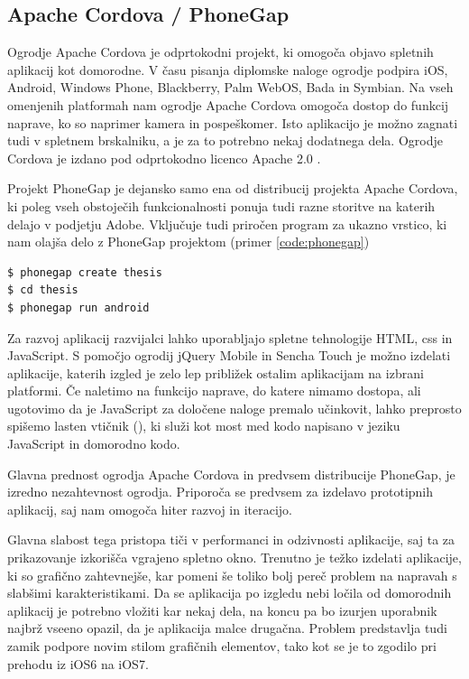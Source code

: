 \subsection{Apache Cordova / PhoneGap}

Ogrodje Apache Cordova\cite{cordova} je odprtokodni projekt, ki omogoča objavo spletnih aplikacij kot domorodne. V času pisanja diplomske naloge ogrodje podpira iOS, Android, Windows Phone, Blackberry, Palm WebOS, Bada in Symbian. Na vseh omenjenih platformah nam ogrodje Apache Cordova omogoča dostop do funkcij naprave, ko so naprimer kamera in pospeškomer. Isto aplikacijo je možno zagnati tudi v spletnem brskalniku, a je za to potrebno nekaj dodatnega dela. Ogrodje Cordova je izdano pod odprtokodno licenco Apache 2.0 \cite{apache-licence}.

Projekt PhoneGap\cite{phonegap} je dejansko samo ena od distribucij projekta Apache Cordova, ki poleg vseh obstoječih funkcionalnosti ponuja tudi razne storitve na katerih delajo v podjetju Adobe. Vključuje tudi priročen program za ukazno vrstico, ki nam olajša delo z PhoneGap projektom (primer \ref{code:phonegap})

\begin{lstlisting}[caption=Primer uporabe programa phonegap za ukazno vrstico. Zadnja vrstica zažene pravkar ustvarjeno prazno aplikacijo na android napravi ali emulatorju., label=code:phonegap]
$ phonegap create thesis
$ cd thesis
$ phonegap run android
\end{lstlisting}

Za razvoj aplikacij razvijalci lahko uporabljajo spletne tehnologije HTML, \gls{css} in JavaScript. S pomočjo ogrodij jQuery Mobile\cite{jquerymobile} in Sencha Touch\cite{sencha} je možno izdelati aplikacije, katerih izgled je zelo lep približek ostalim aplikacijam na izbrani platformi. Če naletimo na funkcijo naprave, do katere nimamo dostopa, ali ugotovimo da je JavaScript za določene naloge premalo učinkovit, lahko preprosto spišemo lasten vtičnik (), ki služi kot most med kodo napisano v jeziku JavaScript in domorodno kodo.

Glavna prednost ogrodja Apache Cordova in predvsem distribucije PhoneGap, je izredno nezahtevnost ogrodja. Priporoča se predvsem za izdelavo prototipnih aplikacij, saj nam omogoča hiter razvoj in iteracijo.

Glavna slabost tega pristopa tiči v performanci in odzivnosti aplikacije, saj ta za prikazovanje izkorišča vgrajeno spletno okno. Trenutno je težko izdelati aplikacije, ki so grafično zahtevnejše, kar pomeni še toliko bolj pereč problem na napravah s slabšimi karakteristikami. Da se aplikacija po izgledu nebi ločila od domorodnih aplikacij je potrebno vložiti kar nekaj dela, na koncu pa bo izurjen uporabnik najbrž vseeno opazil, da je aplikacija malce drugačna. Problem predstavlja tudi zamik podpore novim stilom grafičnih elementov, tako kot se je to zgodilo pri prehodu iz iOS6 na iOS7.

